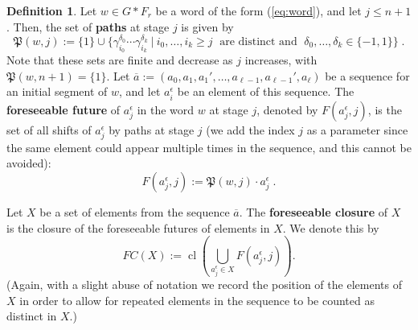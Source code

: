 \documentclass{article}
\theoremstyle{remark}
\theoremstyle{definition}
\newtheorem{definition}[theorem]{Definition}
\DeclareMathOperator{\cl}{cl}
\begin{document}
{\begin{definition}\label{def:rankclean}
Let $w\in G*F_r$ be a %
{word}  of the form (\ref{eq:word}),  and let {$j\leq n+1$}. Then, the set of \textbf{paths} at stage $j$ is given by
\[\mathfrak{P}(w, j):=\{1\}\cup\{\gamma_{i_0}^{\delta_0}\cdots \gamma_{i_k}^{\delta_k} \ \vert \ 
i_0, \dots, i_k\geq j\;
\text{ are distinct and }\; \delta_0, \dots, \delta_k\in\{-1,1\} 
\}\;.\]
Note that these sets are finite and decrease as $j$ increases, {with $\mathfrak{P}(w, n+1)=\{1\}$}. %
Let ${\overline{a}}:=(a_0,a_1,a_1',\ldots,a_{\ell-1},a_{\ell-1}',a_\ell)$ be a sequence for an initial segment of  $w$, and let $a_i^\epsilon$ be an element of this sequence. The \textbf{foreseeable future} of $a_j^\epsilon$ in the word $w$  at stage $j$, denoted by $F(a_j^\epsilon, j)$, 
is the set of all shifts of $a_j^\epsilon$ by paths at stage $j$ (we add the index  $j$ as a parameter since the same element could appear multiple times in the sequence, and this cannot be avoided): 
\[F(a_j^\epsilon ,j):=\mathfrak{P}(w, j) \cdot  a_j^\epsilon\;.\]

{Let $X$ be a set of elements from the sequence $\overline{a}$. The \textbf{foreseeable closure} of $X$ is the %
 {closure} of the foreseeable futures of elements in $X$.}
We denote this by 
\[FC(X):={\cl}\left(\bigcup_{a_j^\epsilon \in X} F(a_j^\epsilon, j)\right).\]
{(Again, with a slight abuse of notation we record the position of the elements of $X$ in order to allow for repeated elements in the sequence to be counted as distinct in $X$.)}


\end{definition}}
\end{document}
